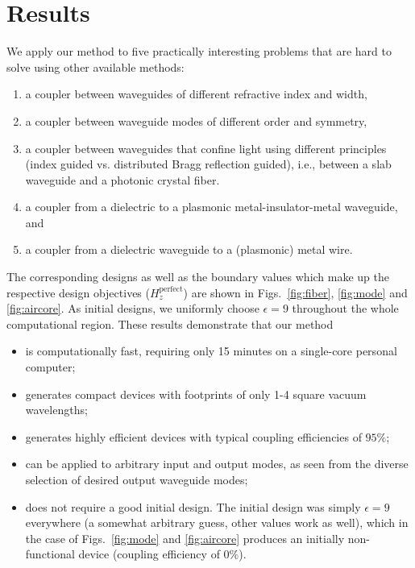 \documentclass[letterpaper,10pt]{article}
\begin{document}
\section{Results}
We apply our method to five practically interesting problems 
    that are hard to solve using other available methods: 
    \begin{enumerate}
    \item a coupler between waveguides of different refractive index and width,
    \item a coupler between waveguide modes of different order and symmetry,
    \item a coupler between waveguides that confine light 
        using different principles 
        (index guided vs. distributed Bragg reflection guided), 
        i.e., between a slab waveguide and a photonic crystal fiber. 
    \item a coupler from a dielectric to a plasmonic metal-insulator-metal 
        waveguide, and
    \item a coupler from a dielectric waveguide to a (plasmonic) metal wire.
    \end{enumerate}

The corresponding designs as well as the boundary values which make up the
    respective design objectives ($H_z^\text{perfect}$) 
    are shown in Figs.~\ref{fig:fiber}, \ref{fig:mode} and \ref{fig:aircore}.
As initial designs, we uniformly choose $\epsilon = 9$ throughout 
    the whole computational region.
These results demonstrate that our method
    \begin{itemize}
    \item is computationally fast, 
        requiring only 15 minutes on a single-core personal computer;
    \item generates compact devices with footprints of only
        1-4 square vacuum wavelengths;
    \item generates highly efficient devices with  
        typical coupling efficiencies of $95\%$;
    \item can be applied to arbitrary input and output modes,
        as seen from the diverse selection of desired output waveguide modes;
    \item does not require a good initial design.
        The initial design was simply $\epsilon = 9$ everywhere
            (a somewhat arbitrary guess, other values work as well),
            which in the case of Figs.~\ref{fig:mode} and \ref{fig:aircore}
            produces an initially non-functional device 
            (coupling efficiency of $0\%$).

    \end{itemize}
\end{document}

